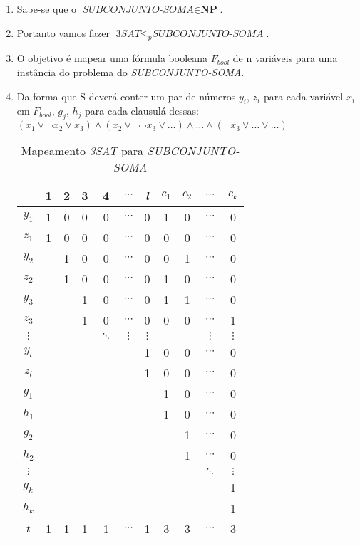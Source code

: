 \documentclass[12pt, a4paper]{article}
\begin{document}
\begin{enumerate}
  \item Sabe-se que o $\textit{SUBCONJUNTO-SOMA} \in \textbf{NP}$.
  \item Portanto vamos fazer $\textit{3SAT} \leqslant_{p} \textit{SUBCONJUNTO-SOMA}$.
  \item O objetivo é mapear uma fórmula booleana $F_{bool}$ de n variáveis para uma instância do problema do \textit{SUBCONJUNTO-SOMA}.
  \item Da forma que S deverá conter um par de números $y_i$, $z_i$ para cada variável $x_i$ em $F_{bool}$, $g_j$, $h_j$ para cada clausulá dessas: $(x_1 \vee \neg x_2 \vee x_3) \wedge (x_2 \vee \neg \neg x_3 \vee \ldots) \wedge \ldots \wedge (\neg x_3 \vee \ldots \vee \ldots)$


\begin{table}[h]\footnotesize
  \centering
\begin{tabular}{|c|c|c|c|c|c|c|c|c|c|c|}
	\hline
	 & 1 & 2 & 3 & 4 & $\cdots$ & \textit{l} & $c_1$ & $c_2$ & $\cdots$ & $c_k$ \\ 
	\hline 
	$y_1$ & 1 & 0 & 0 & 0 & $\cdots$ & 0 & 1 & 0 & $\cdots$ & 0 \\ 
	\hline 
	$z_1$ & 1 & 0 & 0 & 0 & $\cdots$ & 0 & 0 & 0 & $\cdots$ & 0 \\ 
	\hline 
	$y_2$ &  & 1 & 0 & 0 & $\cdots$ & 0 & 0 & 1 & $\cdots$ & 0 \\ 
	\hline 
	$z_2$ &  & 1 & 0 & 0 & $\cdots$ & 0 & 1 & 0 & $\cdots$ & 0 \\ 
	\hline 
	$y_3$ &  &  & 1 & 0 & $\cdots$ & 0 & 1 & 1 & $\cdots$ & 0 \\ 
	\hline 
	$z_3$ &  &  & 1 & 0 & $\cdots$ & 0 & 0 & 0 & $\cdots$ & 1 \\ 
	\hline 
	$\vdots$ &  &  &  & $\ddots$ & $\vdots$ & $\vdots$ &  &  & $\vdots$ & $\vdots$ \\ 
	\hline 
	$y_l$ &  &  &  &  &  & 1 & 0 & 0 & $\cdots$ & 0 \\ 
	\hline 
	$z_l$ &  &  &  &  &  & 1 & 0 & 0 & $\cdots$ & 0 \\ 
	\hline 
	$g_1$ &  &  &  &  &  &  & 1 & 0 & $\cdots$ & 0 \\ 
	\hline 
	$h_1$ &  &  &  &  &  &  & 1 & 0 & $\cdots$ & 0 \\ 
	\hline 
	$g_2$ &  &  &  &  &  &  &  & 1 & $\cdots$ & 0 \\ 
	\hline 
	$h_2$ &  &  &  &  &  &  &  & 1 & $\cdots$ & 0 \\ 
	\hline 
	$\vdots$ &  &  &  &  &  &  &  &  & $\ddots$ & $\vdots$ \\ 
	\hline 
	$g_k$ &  &  &  &  &  &  &  &  &  & 1 \\ 
	\hline 
	$h_k$ &  &  &  &  &  &  &  &  &  & 1 \\ 
	\hline 
	$t$ & 1 & 1 & 1 & 1 & $\cdots$ & 1 & 3 & 3 & $\cdots$ & 3 \\ 
	\hline
\end{tabular}
  \caption{Mapeamento \textit{3SAT} para \textit{SUBCONJUNTO-SOMA}}
\end{table}



\end{enumerate}
\end{document}
